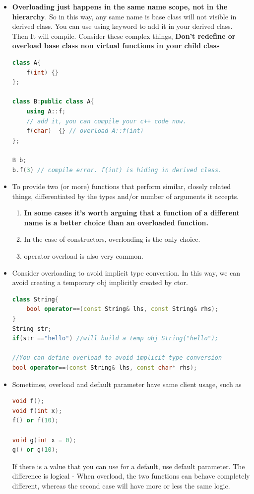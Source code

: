\documentclass[a4paper,12pt,twoside]{book}
\begin{document}
\begin{itemize}
	
	\item  \textbf{Overloading just happens in the same name scope, not in the hierarchy}. So in this way, any same name is base class will not  visible in derived class. You can use using keyword to add it in your derived class. Then It will compile. Consider these complex things, \textbf{Don't redefine or overload base class non virtual functions in your child class}
	
\begin{lstlisting}[frame=single, language=c++]
class A{
	f(int) {}
};
	
class B:public class A{
	using A::f;
	// add it, you can compile your c++ code now.
	f(char)  {} // overload A::f(int)
};
	
B b;
b.f(3) // compile error. f(int) is hiding in derived class.
\end{lstlisting}
	
	\item To provide two (or more) functions that perform similar, closely related things, differentiated by the types and/or number of arguments it accepts.
	
	\begin{enumerate}
		\item \textbf{In some cases it's worth arguing that a function of a different name is a better choice than an overloaded function.}
		
		\item  In the case of constructors, overloading is the only choice.
		
		\item  operator overload is also very common.
	\end{enumerate}
	
	\item Consider overloading to avoid implicit type conversion. In this way, we can avoid creating a temporary obj implicitly created by ctor.
	
\begin{lstlisting}[frame=single, language=c++]
class String{
	bool operator==(const String& lhs, const String& rhs);
}
String str;
if(str =="hello") //will build a temp obj String("hello");
	
//You can define overload to avoid implicit type conversion
bool operator==(const String& lhs, const char* rhs);
\end{lstlisting}
	
	
	\item Sometimes, overload and default parameter have same client usage, such as
\begin{lstlisting}[frame=single, language=c++]
void f();
void f(int x);
f() or f(10);
	
void g(int x = 0);
g() or g(10);
\end{lstlisting}

	If there is a value that you can use for a default, use default parameter. The difference is logical - When overload, the two functions can behave completely different, whereas the second case will have more or less the same logic.
	
\end{itemize}
\end{document}
